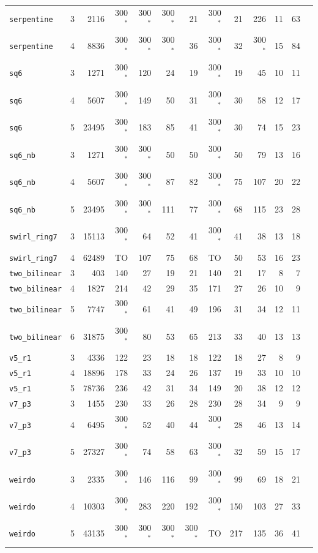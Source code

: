 \documentclass[10pt,a4paper]{article}
\begin{document}
\begin{center}
\begin{tabular}{@{}lcrrrrrrrrrrr@{}}
\texttt{serpentine} & 3 & 2116 & 300$^*$ & 300$^*$ & 300$^*$ & 21 & 300$^*$ & 21 & 226 & 11 & 63 \\
\texttt{serpentine} & 4 & 8836 & 300$^*$ & 300$^*$ & 300$^*$ & 36 & 300$^*$ & 32 & 300$^*$ & 15 & 84 \\
\texttt{sq6} & 3 & 1271 & 300$^*$ & 120 & 24 & 19 & 300$^*$ & 19 & 45 & 10 & 11 \\
\texttt{sq6} & 4 & 5607 & 300$^*$ & 149 & 50 & 31 & 300$^*$ & 30 & 58 & 12 & 17 \\
\texttt{sq6} & 5 & 23495 & 300$^*$ & 183 & 85 & 41 & 300$^*$ & 30 & 74 & 15 & 23 \\
\texttt{sq6\_nb} & 3 & 1271 & 300$^*$ & 300$^*$ & 50 & 50 & 300$^*$ & 50 & 79 & 13 & 16 \\
\texttt{sq6\_nb} & 4 & 5607 & 300$^*$ & 300$^*$ & 87 & 82 & 300$^*$ & 75 & 107 & 20 & 22 \\
\texttt{sq6\_nb} & 5 & 23495 & 300$^*$ & 300$^*$ & 111 & 77 & 300$^*$ & 68 & 115 & 23 & 28 \\
\texttt{swirl\_ring7} & 3 & 15113 & 300$^*$ & 64 & 52 & 41 & 300$^*$ & 41 & 38 & 13 & 18 \\
\texttt{swirl\_ring7} & 4 & 62489 & TO & 107 & 75 & 68 & TO & 50 & 53 & 16 & 23 \\
\texttt{two\_bilinear} & 3 & 403 & 140 & 27 & 19 & 21 & 140 & 21 & 17 & 8 & 7 \\
\texttt{two\_bilinear} & 4 & 1827 & 214 & 42 & 29 & 35 & 171 & 27 & 26 & 10 & 9 \\
\texttt{two\_bilinear} & 5 & 7747 & 300$^*$ & 61 & 41 & 49 & 196 & 31 & 34 & 12 & 11 \\
\texttt{two\_bilinear} & 6 & 31875 & 300$^*$ & 80 & 53 & 65 & 213 & 33 & 40 & 13 & 13 \\
\texttt{v5\_r1} & 3 & 4336 & 122 & 23 & 18 & 18 & 122 & 18 & 27 & 8 & 9 \\
\texttt{v5\_r1} & 4 & 18896 & 178 & 33 & 24 & 26 & 137 & 19 & 33 & 10 & 10 \\
\texttt{v5\_r1} & 5 & 78736 & 236 & 42 & 31 & 34 & 149 & 20 & 38 & 12 & 12 \\
\texttt{v7\_p3} & 3 & 1455 & 230 & 33 & 26 & 28 & 230 & 28 & 34 & 9 & 9 \\
\texttt{v7\_p3} & 4 & 6495 & 300$^*$ & 52 & 40 & 44 & 300$^*$ & 28 & 46 & 13 & 14 \\
\texttt{v7\_p3} & 5 & 27327 & 300$^*$ & 74 & 58 & 63 & 300$^*$ & 32 & 59 & 15 & 17 \\
\texttt{weirdo} & 3 & 2335 & 300$^*$ & 146 & 116 & 99 & 300$^*$ & 99 & 69 & 18 & 21 \\
\texttt{weirdo} & 4 & 10303 & 300$^*$ & 283 & 220 & 192 & 300$^*$ & 150 & 103 & 27 & 33 \\
\texttt{weirdo} & 5 & 43135 & 300$^*$ & 300$^*$ & 300$^*$ & 300$^*$ & TO & 217 & 135 & 36 & 41 \\
\bottomrule
\end{tabular}
\end{center}
\end{document}
